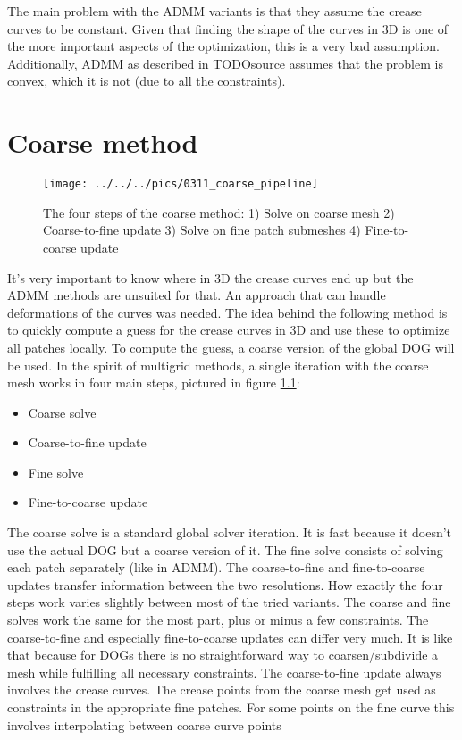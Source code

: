 \documentclass[a4paper,twoside,12pt,nochapterprefix]{scrbook}
\begin{document}
The main problem with the ADMM variants is that they assume the crease curves to be constant. Given that finding the shape of the curves in 3D is one of the more important aspects of the optimization, this is a very bad assumption. Additionally, ADMM as described in TODOsource assumes that the problem  is convex, which it is not (due to all the constraints).\newline

\chapter{Coarse method}\label{sec:coarse}
\begin{figure}
    \centering
    \texttt{[image: ../../../pics/0311\_coarse\_pipeline]}
    \caption{The four steps of the coarse method: 1) Solve on coarse mesh 2) Coarse-to-fine update 3) Solve on fine patch submeshes 4) Fine-to-coarse update}
     \label{fig:coarse_method}
\end{figure}
It's very important to know where in 3D the crease curves end up but the ADMM methods are unsuited for that. An approach that can handle deformations of the curves was needed.\newline
The idea behind the following method is to quickly compute a guess for the crease curves in 3D and use these to optimize all patches locally. To compute the guess, a coarse version of the global DOG will be used.\newline
In the spirit of multigrid methods, a single iteration with the coarse mesh works in four main steps, pictured in figure \ref{fig:coarse_method}:\newline%
\begin{itemize}
\item Coarse solve
\item Coarse-to-fine update
\item Fine solve
\item Fine-to-coarse update
\end{itemize}
The coarse solve is a standard global solver iteration. It is fast because it doesn't use the actual DOG but a coarse version of it. The fine solve consists of solving each patch separately (like in ADMM). The coarse-to-fine and fine-to-coarse updates transfer information between the two resolutions.\newline
How exactly the four steps work varies slightly between most of the tried variants. The coarse and fine solves work the same for the most part, plus or minus a few constraints. The coarse-to-fine and especially fine-to-coarse updates can differ very much. It is like that because for DOGs there is no straightforward way to coarsen/subdivide a mesh while fulfilling all necessary constraints.\newline
The coarse-to-fine update always involves the crease curves. The crease points from the coarse mesh get used as constraints in the appropriate fine patches. For some points on the fine curve this involves interpolating between coarse curve points
\end{document}
